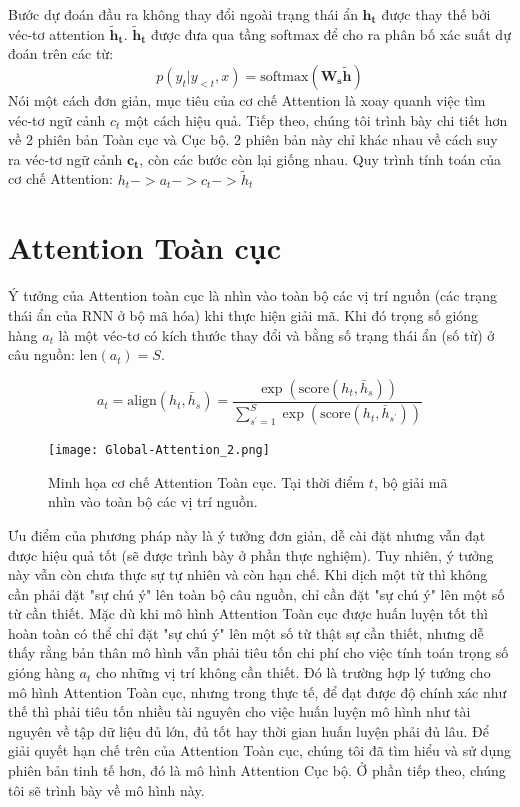 Bước dự đoán đầu ra không thay đổi ngoài trạng thái ẩn $\bm{h_t}$ được thay thế bởi véc-tơ attention $\bm{\tilde{h}_t}$. $\bm{\tilde{h}_t}$ được đưa qua tầng softmax để cho ra phân bố xác suất dự đoán trên các từ:
\begin{equation}
p(y_t | y_{<t}, x) = \text{softmax}(\bm{W_s\tilde{h}})
\end{equation}
Nói một cách đơn giản, mục tiêu của cơ chế Attention là xoay quanh việc tìm véc-tơ ngữ cảnh $c_t$ một cách hiệu quả.
Tiếp theo, chúng tôi trình bày chi tiết hơn về 2 phiên bản Toàn cục và Cục bộ. 2 phiên bản này chỉ khác nhau về cách suy ra véc-tơ ngữ cảnh $\bm{c_t}$, còn các bước còn lại giống nhau.
Quy trình tính toán của cơ chế Attention: $h_t -> a_t -> c_t -> \tilde{h}_t$
\section{Attention Toàn cục}
Ý tưởng của Attention toàn cục là nhìn vào toàn bộ các vị trí nguồn (các trạng thái ẩn của RNN ở bộ mã hóa) khi thực hiện giải mã.
Khi đó trọng số gióng hàng $a_t$ là một véc-tơ có kích thước thay đổi và bằng số trạng thái ẩn (số từ) ở câu nguồn: $\text{len}(a_t) = S$.

\begin{equation}
a_t = \text{align}(h_t, \bar{h}_s) = \frac{\exp\left(\text{score}(h_t, \bar{h}_s)\right)}{\sum^{S}_{s^{'}=1}\exp\left(\text{score}(h_t, \bar{h}_{s^{'}})\right)}
\end{equation}

\begin{figure}
	\centering
	\texttt{[image: Global-Attention\_2.png]}
	\caption[Minh họa cơ chế Attention Toàn cục.]{Minh họa cơ chế Attention Toàn cục. Tại thời điểm $t$, bộ giải mã nhìn vào toàn bộ các vị trí nguồn.}
	\label{fig_Global_Attention}
\end{figure}

Ưu điểm của phương pháp này là ý tưởng đơn giản, dễ cài đặt nhưng vẫn đạt được hiệu quả tốt (sẽ được trình bày ở phần thực nghiệm). Tuy nhiên, ý tưởng này vẫn còn chưa thực sự tự nhiên và còn hạn chế. Khi dịch một từ thì không cần phải đặt "sự chú ý" lên toàn bộ câu nguồn, chỉ cần đặt "sự chú ý" lên một số từ cần thiết. Mặc dù khi mô hình Attention Toàn cục được huấn luyện tốt thì hoàn toàn có thể chỉ đặt "sự chú ý" lên một số từ thật sự cần thiết, nhưng dễ thấy rằng bản thân mô hình vẫn phải tiêu tốn chi phí cho việc tính toán trọng số gióng hàng $a_t$ cho những vị trí không cần thiết. Đó là trường hợp lý tưởng cho mô hình Attention Toàn cục, nhưng trong thực tế, để đạt được độ chính xác như thế thì phải tiêu tốn nhiều tài nguyên cho việc huấn luyện mô hình như tài nguyên về tập dữ liệu đủ lớn, đủ tốt hay thời gian huấn luyện phải đủ lâu.
Để giải quyết hạn chế trên của Attention Toàn cục, chúng tôi đã tìm hiểu và sử dụng phiên bản tinh tế hơn, đó là mô hình Attention Cục bộ. Ở phần tiếp theo, chúng tôi sẽ trình bày về mô hình này.


